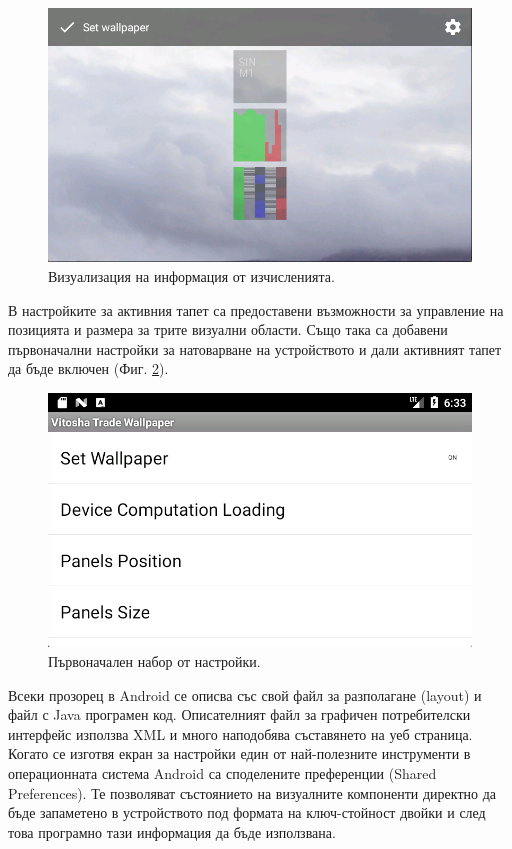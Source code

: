 \documentclass[book,14pt,oneside,openany]{memoir}
\begin{document}
\begin{figure}[h]
  \centering
  \includegraphics[width=1.0\linewidth]{./images/pic0019.png}
  \caption{Визуализация на информация от изчисленията.}
\label{fig:pic0019}
\end{figure}
\FloatBarrier

В настройките за активния тапет са предоставени възможности за управление на позицията и размера за трите визуални области. Също така са добавени първоначални настройки за натоварване на устройството и дали активният тапет да бъде включен (Фиг. \ref{fig:pic0020}). 

\begin{figure}[h]
  \centering
  \includegraphics[width=1.0\linewidth]{./images/pic0020.png}
  \caption{Първоначален набор от настройки.}
\label{fig:pic0020}
\end{figure}
\FloatBarrier

Всеки прозорец в Android се описва със свой файл за разполагане (layout) и файл с Java програмен код. Описателният файл за графичен потребителски интерфейс използва XML и много наподобява съставянето на уеб страница. Когато се изготвя екран за настройки един от най-полезните инструменти в операционната система Android са споделените преференции (Shared Preferences). Те позволяват състоянието на визуалните компоненти директно да бъде запаметено в устройството под формата на ключ-стойност двойки и след това програмно тази информация да бъде използвана. 
\end{document}
